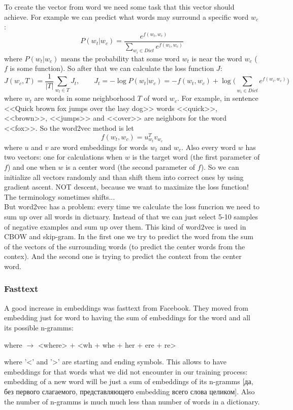 To create the vector from word we need some task that this vector should achieve. For example we can predict what words may surround a specific word $w_c$:
$$P(w_t|w_c)=\frac{e^{f(w_t,w_c)}}{\sum\limits_{w_i\in Dict}e^{f(w_i,w_c)}}$$
where $P(w_t|w_c)$ means the probability that some word $w_t$ is near the word $w_c$ ($f$ is some function). So after that we can calculate the loss function $J$:
$$J(w_c, T)=\frac{1}{|T|}\sum\limits_{w_t\in T}J_t,\qquad J_t=-\log P(w_t|w_c)=-f(w_t,w_c)+\log\Big(\sum\limits_{w_i\in Dict}e^{f(w_i,w_c)}\Big)$$
where $w_t$ are words in some neighborhood $T$ of word $w_c$. For example, in sentence <<Quick brown fox jumps over the lasy dog>> words <<quick>>, <<brown>>, <<jumps>> and <<over>> are neighbors for the word <<fox>>. So the word2vec method is let
$$f(w_t,w_c)=u_{w_t}^Tv_{w_c}$$
where $u$ and $v$ are word embeddings for words $w_t$ and $w_c$. Also every word $w$ has two vectors: one for calculations when $w$ is the target word (the first parameter of $f$) and one when $w$ is a center word (the second parameter of $f$). So we can initialize all vectors randomly and than shift them into correct ones by using gradient ascent. NOT descent, because we want to maximize the loss function! The terminology sometimes shifts...\\
But word2vec has a problem: every time we calculate the loss funcrion we need to sum up over all words in dictuary. Instead of that we can just select 5-10 samples of negative examples and sum up over them. This kind of word2vec is used in CBOW and skip-gram. In the first one we try to predict the word from the sum of the vectors of the surrounding words (to predict the center words from the contex). And the second one is trying to predict the context from the center word.

\subsubsection*{Fasttext}

A good increase in embeddings was fasttext from Facebook. They moved from embedding just for word to having the sum of embeddings for the word and all its possible n-gramms:
\begin{center}
	where $\to$ <where> + <wh + whe + her + ere + re>
\end{center}
where '<' and '>' are starting and ending symbols. This allows to have embeddings for that words what we did not encounter in our training process: embedding of a new word will be just a sum of embeddings of its n-gramms [да, без первого слагаемого, представляющего embedding всего слова целиком]. Also the number of n-gramms is much much less than number of words in a dictionary.

